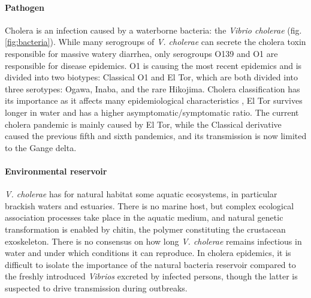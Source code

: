\paragraph{Pathogen} Cholera is an infection caused by a waterborne bacteria: the \emph{Vibrio cholerae} (fig. \ref{fig:bacteria}). While many serogroups of \emph{V. cholerae} can secrete the cholera toxin responsible for massive watery diarrhea, only serogroups O139 and O1 are responsible for disease epidemics. O1 is causing the most recent epidemics and is divided into two biotypes: Classical O1 and El Tor, which are both divided into three serotypes: Ogawa, Inaba, and the rare Hikojima\cite{Kaper:Cholera:1995}. Cholera classification has its importance as it affects many epidemiological characteristics \eg, El Tor survives longer in water and has a higher asymptomatic/symptomatic ratio\cite{WHO:CholeraVaccinesWHO:2017}. The current cholera pandemic is mainly caused by El Tor, while the Classical derivative caused the previous fifth and sixth pandemics, and its transmission is now limited to the Gange delta\cite{Nair:CholeraDueAltered:2006, Domman:DefiningEndemicCholera:2018}. 

 \paragraph{Environmental reservoir}  \textit{V. cholerae} has for natural habitat some aquatic ecosystems, in particular brackish waters and estuaries. There is no marine host, but complex ecological association processes take place in the aquatic medium, and natural genetic transformation is enabled by chitin, the polymer constituting the crustacean exoskeleton\cite{Reidl:VibrioCholeraeCholera:2002,Meibom:ChitinInducesNatural:2005}. There is no consensus on how long \textit{V. cholerae} remains infectious in water and under which conditions it can reproduce\cite{Mavian:ToxigenicVibrioCholerae:2020}. In cholera epidemics, it is difficult to isolate the importance of the natural bacteria reservoir compared to the freshly introduced \textit{Vibrios} excreted by infected persons, though the latter is suspected to drive transmission during outbreaks.

